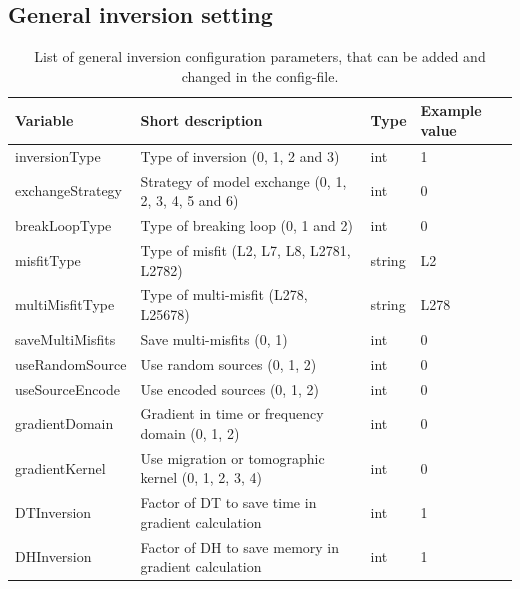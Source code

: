 \documentclass[pdftex,a4paper,parskip,listof=totoc,bibliography=totoc,onehalfspacing,12pt]{scrreprt}
\begin{document}
\subsection{General inversion setting}
\begin{table}[h!]
\caption[List of general inversion configuration parameters.]{List of general inversion configuration parameters, that can be added and changed in the config-file.}\label{tab:config_general_inversion_setting}
\centering
\begin{adjustbox}{width=1\textwidth,center=\textwidth}
	\begin{tabular}{llll}
	\toprule
         Variable                 & Short description                                                   & Type   & Example value \\
	\midrule                 
         inversionType               & Type of inversion (0, 1, 2 and 3)                                                    & int & 1  \\
         exchangeStrategy               & Strategy of model exchange (0, 1, 2, 3, 4, 5 and 6)                                                    & int & 0  \\
         breakLoopType               & Type of breaking loop (0, 1 and 2)                                                    & int & 0  \\
         misfitType               & Type of misfit (L2, L7, L8, L2781, L2782) & string & L2  \\
         multiMisfitType               & Type of multi-misfit (L278, L25678)                                                     & string & L278  \\
         saveMultiMisfits & Save multi-misfits (0, 1) & int & 0 \\
         useRandomSource & Use random sources (0, 1, 2) & int & \num{0} \\
         useSourceEncode & Use encoded sources (0, 1, 2) & int & \num{0} \\
         gradientDomain & Gradient in time or frequency domain (0, 1, 2) & int & \num{0} \\
         gradientKernel & Use migration or tomographic kernel (0, 1, 2, 3, 4) & int & \num{0} \\
         DTInversion              & Factor of DT to save time in gradient calculation   &  int   & 1 \\
         DHInversion              & Factor of DH to save memory in gradient calculation   &  int   & 1 \\

\end{tabular}
\end{adjustbox}
\end{table}
\end{document}
